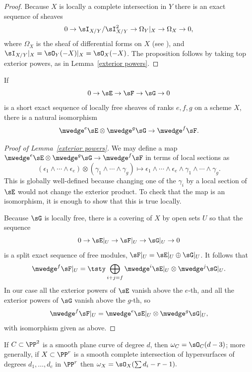 \begin{proof}
 Because $X$ is locally a complete intersection in $Y$ there is an exact sequence of sheaves
 $$
0\to  \sI_{X/Y}/\sI_{X/Y}^{2} \to \Omega_{Y}| _{X} \to \Omega_{X} \to 0
,
 $$
 where $\Omega_{X}$ is the sheaf of differential forms on $X$ (see \cite[Proposition 16.3]{Eisenbud95}), and
$ \sI_{X/Y}|_{X} = \sO_{Y}(-X)|_{X} = \sO_{X}(-X)$. The proposition follows by taking top exterior powers, 
as in Lemma~\ref{exterior powers}.\end{proof}

\begin{lemma}\label{exterior powers}
 If 
$$
0\to \sE \to \sF\to \sG \to 0
$$
is a short exact sequence of locally free sheaves of ranks $e,f,g$ 
 on a scheme $X$, there is a natural
isomorphism 
$$
\mwedge^e\sE \otimes \mwedge^g \sG \to \mwedge^f\sF.
$$
\end{lemma}

\begin{proof}[Proof of Lemma~\ref{exterior powers}]
 We may define a map
$
\mwedge^e\sE \otimes \mwedge^g \sG \to \mwedge^f\sF
$
in terms of local sections as
$$
(\epsilon_1\wedge\cdots \wedge \epsilon_e) \otimes (\gamma_1\wedge\cdots\wedge \gamma_g)
\mapsto \epsilon_1\wedge\cdots \wedge \epsilon_e\wedge\gamma_1\wedge\cdots\wedge \gamma_g.
$$
This is globally well-defined because changing one of the $\gamma_i$ by a local section of $\sE$ would not
change the exterior product.
To check that the map is an isomorphism, it is enough to show that this is true locally.

Because $\sG$ is locally free, there is a covering of $X$ by open sets $U$
so that the sequence
$$
0\to \sE|_U \to \sF|_U\to \sG|_U \to 0
$$
is a split exact sequence of free modules, $\sF|_U = \sE|_U\oplus \sG|_U$.
It follows that
$$
\mwedge^f\sF|_U = 
\tsty\bigoplus\limits_{i+j = f} \mwedge^i \sE|_U \otimes \mwedge^j\sG|_U.
$$
In our case all the exterior powers of $\sE$ vanish above the $e$-th, and all the 
exterior powers of $\sG$ vanish above the $g$-th, so 
$$
\mwedge^f\sF|_U =  \mwedge^e \sE|_U \otimes \mwedge^g\sG|_U,
$$
with isomorphism given as above.
\end{proof}


\begin{corollary}\label{canonical of plane curve}\label{canonical of complete intersection}
If $C\subset \PP^{2}$ is a smooth plane curve of degree $d$, then
$\omega_{C} = \sO_{C}(d-\nobreak 3)$; more generally, if
$X\subset \PP^{r}$ is a smooth complete intersection of hypersurfaces of degrees $d_{1},\dots, d_{c}$ in $\PP^r$ then
$\omega_{X} = \sO_{X}(\sum d_{i }-r-1).$
\vspace*{-3pt}
\end{corollary}

